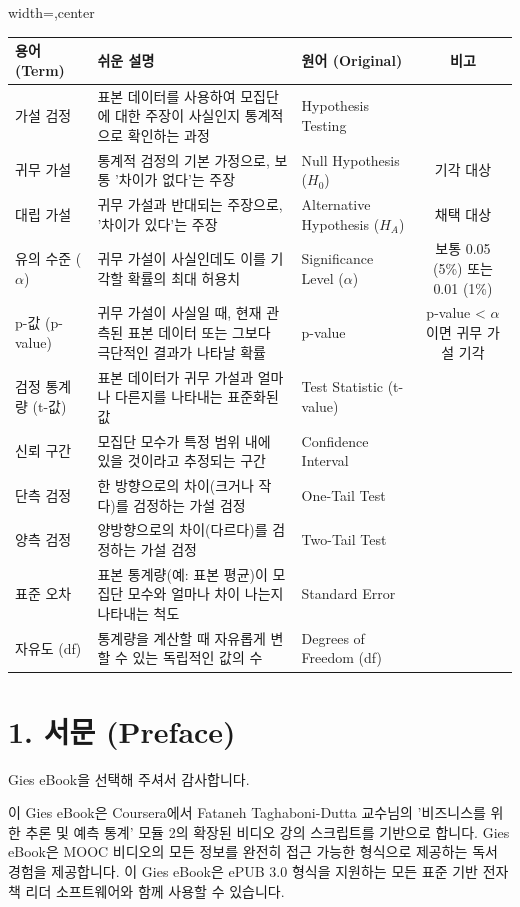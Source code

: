 \documentclass[11pt,a4paper]{article}
\theoremstyle{definition}
\begin{document}
\begin{adjustbox}{width=\textwidth,center}
\begin{tabular}{lllc}
\toprule
\textbf{용어 (Term)} & \textbf{쉬운 설명} & \textbf{원어 (Original)} & \textbf{비고} \\
\midrule
가설 검정 & 표본 데이터를 사용하여 모집단에 대한 주장이 사실인지 통계적으로 확인하는 과정 & Hypothesis Testing & \\
귀무 가설 & 통계적 검정의 기본 가정으로, 보통 '차이가 없다'는 주장 & Null Hypothesis ($H_0$) & 기각 대상 \\
대립 가설 & 귀무 가설과 반대되는 주장으로, '차이가 있다'는 주장 & Alternative Hypothesis ($H_A$) & 채택 대상 \\
유의 수준 ($\alpha$) & 귀무 가설이 사실인데도 이를 기각할 확률의 최대 허용치 & Significance Level ($\alpha$) & 보통 0.05 (5\%) 또는 0.01 (1\%) \\
p-값 (p-value) & 귀무 가설이 사실일 때, 현재 관측된 표본 데이터 또는 그보다 극단적인 결과가 나타날 확률 & p-value & p-value < $\alpha$ 이면 귀무 가설 기각 \\
검정 통계량 (t-값) & 표본 데이터가 귀무 가설과 얼마나 다른지를 나타내는 표준화된 값 & Test Statistic (t-value) & \\
신뢰 구간 & 모집단 모수가 특정 범위 내에 있을 것이라고 추정되는 구간 & Confidence Interval & \\
단측 검정 & 한 방향으로의 차이(크거나 작다)를 검정하는 가설 검정 & One-Tail Test & \\
양측 검정 & 양방향으로의 차이(다르다)를 검정하는 가설 검정 & Two-Tail Test & \\
표준 오차 & 표본 통계량(예: 표본 평균)이 모집단 모수와 얼마나 차이 나는지 나타내는 척도 & Standard Error & \\
자유도 (df) & 통계량을 계산할 때 자유롭게 변할 수 있는 독립적인 값의 수 & Degrees of Freedom (df) & \\
\bottomrule
\end{tabular}
\end{adjustbox}

\newpage
\section{1. 서문 (Preface)}

Gies eBook을 선택해 주셔서 감사합니다.

이 Gies eBook은 Coursera에서 Fataneh Taghaboni-Dutta 교수님의 '비즈니스를 위한 추론 및 예측 통계' 모듈 2의 확장된 비디오 강의 스크립트를 기반으로 합니다. Gies eBook은 MOOC 비디오의 모든 정보를 완전히 접근 가능한 형식으로 제공하는 독서 경험을 제공합니다. 이 Gies eBook은 ePUB 3.0 형식을 지원하는 모든 표준 기반 전자책 리더 소프트웨어와 함께 사용할 수 있습니다.
\end{document}
